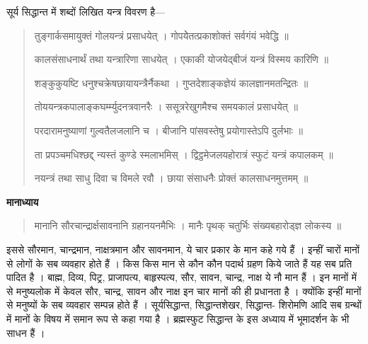 \documentclass[11pt,a4paper]{article}
\newcommand{\dev}[1]{{\devanagarifont #1}}
\newenvironment{shloka}{\begin{quote}\devanagarifont}{\end{quote}}
\newenvironment{hindicom}{\devanagarifont}{\par}
\begin{document}
\begin{hindicom}
\dev{सूर्य सिद्धान्त में शब्दों लिखित यन्त्र विवरण है---}
\end{hindicom}

\begin{shloka}
\dev{तुङ्गार्कसमायुक्तं गोलयन्त्रं प्रसाधयेत् ।}
\dev{गोपयेेतत्प्रकाशोक्तं सर्वगंयं भवेद्धि ॥}

\dev{कालसंसाधनार्थं तथा यन्त्रारिणा साधयेत् ।}
\dev{एकाकी योजयेद्‌बीजं यन्त्रं विस्मय कारिणि ॥}

\dev{शङ्कुकुयष्टि धनुश्चक्रेषछायायन्त्रैर्नैकथा ।}
\dev{गुप्तदेशाङ्कज्ञेयं कालज्ञानमतन्द्रितः ॥}

\dev{तोययन्त्रकपालाङ्कघर्म्म्युदनत्रवानरैः ।}
\dev{ससूत्ररेखुगमैश्च समयकालं प्रसाधयेत् ॥}

\dev{परदारामनुष्याणां गुल्वतैलजलानि च ।}
\dev{बीजानि पांसवस्तेषु प्रयोगास्तेऽपि दुर्लभाः ॥}

\dev{ता प्रपञ्चमधिश्छद्द् न्यस्तं कुण्डे स्मलाभमिस् ।}
\dev{द्विट्ठमेजलयहोरात्रं स्फुटं यन्त्रं कपालकम् ॥}

\dev{नयन्त्रं तथा साधु दिवा च विमले रवौ ।}
\dev{छाया संसाधनैः प्रोक्तं कालसाधनमुत्तमम् ॥}
\end{shloka}

\vspace{0.5cm}
\noindent\textbf{\dev{मानाध्याय}}

\begin{shloka}
\dev{मानानि सौरचान्द्रार्क्षसावनानि ग्रहानयनमैभिः ।}
\dev{मानैः पृथक् चतुर्भिः संख्यबहारोड्ज्ञ लोकस्य ॥}
\end{shloka}

\begin{hindicom}
\dev{इससे सौरमान, चान्द्रमान, नाक्षत्रमान और सावनमान, ये चार प्रकार के मान}
\dev{कहे गये हैं । इन्हीं चारों मानों से लोगों के सब व्यवहार होते हैं । किस किस मान से कौन}
\dev{कौन पदार्थ ग्रहण किये जाते हैं यह सब प्रति पादित है । बाह्म, दिव्य, पिट्र, प्राजापत्य,}
\dev{बाहृस्पत्य, सौर, सावन, चान्द्र, नाक्ष ये नौ मान हैं । इन मानों में से मनुष्यलोक}
\dev{में केवल सौर, चान्द्र, सावन और नाक्ष इन चार मानों की ही प्रधानता है । क्योंकि}
\dev{इन्हीं मानों से मनुष्यों के सब व्यवहार सम्पन्न होते हैं । सूर्यसिद्धान्त, सिद्धान्तशेखर, सिद्धान्त-}
\dev{शिरोमणि आदि सब ग्रन्थों में मानों के विषय में समान रूप से कहा गया है । ब्रह्मस्फुट}
\dev{सिद्धान्त के इस अध्याय में भूमादर्शन के भी साधन हैं ।}
\end{hindicom}

\newpage

\end{document}

